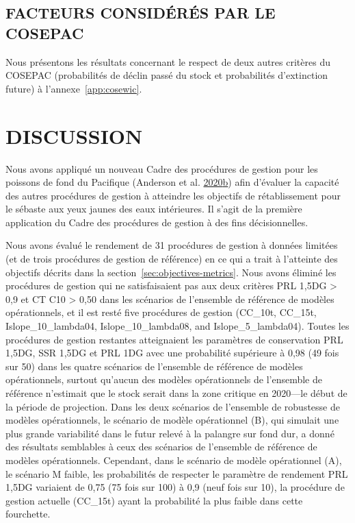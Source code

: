 \documentclass[11pt]{book}
\begin{document}
\hypertarget{facteurs-considuxe9ruxe9s-par-le-cosepac}{%
\subsection{FACTEURS CONSIDÉRÉS PAR LE COSEPAC}\label{facteurs-considuxe9ruxe9s-par-le-cosepac}}

Nous présentons les résultats concernant le respect de deux autres critères du COSEPAC (probabilités de déclin passé du stock et probabilités d'extinction future) à l'annexe~\ref{app:cosewic}.

\hypertarget{sec:discussion}{%
\section{DISCUSSION}\label{sec:discussion}}

Nous avons appliqué un nouveau Cadre des procédures de gestion pour les poissons de fond du Pacifique (Anderson et al. \protect\hyperlink{ref-anderson2020gfmp}{2020}\protect\hyperlink{ref-anderson2020gfmp}{b}) afin d'évaluer la capacité des autres procédures de gestion à atteindre les objectifs de rétablissement pour le sébaste aux yeux jaunes des eaux intérieures. Il s'agit de la première application du Cadre des procédures de gestion à des fins décisionnelles.

Nous avons évalué le rendement de 31 procédures de gestion à données limitées (et de trois procédures de gestion de référence) en ce qui a trait à l'atteinte des objectifs décrits dans la section~\ref{sec:objectives-metrics}. Nous avons éliminé les procédures de gestion qui ne satisfaisaient pas aux deux critères PRL 1,5DG \textgreater{} 0,9 et CT C10 \textgreater{} 0,50 dans les scénarios de l'ensemble de référence de modèles opérationnels, et il est resté five procédures de gestion (CC\_10t, CC\_15t, Islope\_10\_lambda04, Islope\_10\_lambda08, and Islope\_5\_lambda04). Toutes les procédures de gestion restantes atteignaient les paramètres de conservation PRL 1,5DG, SSR 1,5DG et PRL 1DG avec une probabilité supérieure à 0,98 (49 fois sur 50) dans les quatre scénarios de l'ensemble de référence de modèles opérationnels, surtout qu'aucun des modèles opérationnels de l'ensemble de référence n'estimait que le stock serait dans la zone critique en 2020---le début de la période de projection. Dans les deux scénarios de l'ensemble de robustesse de modèles opérationnels, le scénario de modèle opérationnel (B), qui simulait une plus grande variabilité dans le futur relevé à la palangre sur fond dur, a donné des résultats semblables à ceux des scénarios de l'ensemble de référence de modèles opérationnels. Cependant, dans le scénario de modèle opérationnel (A), le scénario M faible, les probabilités de respecter le paramètre de rendement PRL 1,5DG variaient de 0,75 (75 fois sur 100) à 0,9 (neuf fois sur 10), la procédure de gestion actuelle (CC\_15t) ayant la probabilité la plus faible dans cette fourchette.
\end{document}
